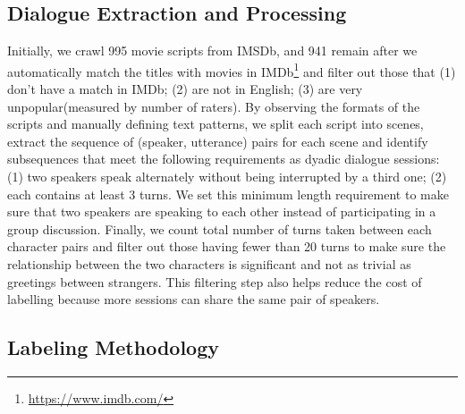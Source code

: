 \subsection{Dialogue Extraction and Processing}
Initially, we crawl 995 movie scripts from IMSDb, and 941 remain after 
we automatically match the titles with movies in 
IMDb\footnote{\url{https://www.imdb.com/}} and filter out those that 
(1) don't have a match in IMDb; (2) are not in English; 
(3) are very unpopular(measured by number of raters). 
By observing the formats of the scripts and manually defining text patterns, 
we split each script into scenes, extract the sequence of (speaker, utterance) 
pairs for each scene and identify subsequences that meet the following requirements  
as dyadic dialogue sessions: 
(1) two speakers speak alternately without being interrupted 
by a third one; 
(2) each contains at least 3 turns. 
We set this minimum length requirement to make sure 
that two speakers are speaking to each other instead of 
participating in a group discussion. 
Finally, we count total number of turns taken 
between each character pairs and filter out those having 
fewer than 20 turns to 
make sure the relationship between the two characters is significant 
and not as trivial as greetings between strangers. 
This filtering step also helps reduce the cost of labelling 
because more sessions can share the same pair of speakers.

\subsection{Labeling Methodology}

